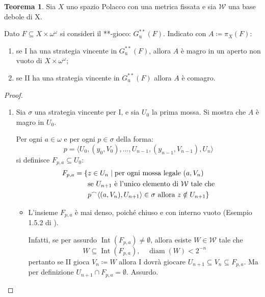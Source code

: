 \documentclass[titlepage]{article}
\newcommand{\1}{\mathds{1}}
\newcommand{\concat}{\null^{\frown}} %
\theoremstyle{definition}%
\newtheorem{thm}{Teorema}[section]
\theoremstyle{plain}
\theoremstyle{remark}
\begin{document}
\begin{thm}\label{sec:org21015ec}
Sia \(X\) uno spazio Polacco con una metrica fissata e sia \(\mathcal{W}\) una base debole di X.

Dato \(F \subseteq X\times \omega^{\omega}\) si consideri il {**-gioco}: \(G^{**}_{\text{u}}(F)\). Indicato con \(A\coloneqq \pi_{X}(F)\):
\begin{enumerate}
\item se I ha una {strategia} {vincente} in \(G^{**}_{\text{u}}(F)\), allora \(A\) è magro in un aperto non vuoto di \(X\times\omega^{\omega}\);
\item se II ha una {strategia} {vincente} in \(G^{**}_{\text{u}}(F)\) allora \(A\) è comagro.
\end{enumerate}
\end{thm}
\begin{proof}\hphantom{a capo}
\begin{enumerate}
\item Sia \(\sigma\) una strategia vincente per I, e sia \(U_{0}\) la prima mossa. Si mostra che \(A\) è {magro} in \(U_{0}\).

Per ogni \(a \in \omega\) e per ogni \(p \in \sigma\) della forma:
\begin{equation*}
 p=\langle
 	U_{0},({y}_{0}, V_{0}), \dots, U_{n-1}, ({y}_{n-1}, V_{n-1}), U_{n}
 \rangle
\end{equation*}
si definisce \(F_{p,a} \subseteq U_{0}\):
\begin{align*}
 F_{p,a} = \{&z \in U_{n}\mid \text{per ogni mossa legale }(a, V_{n})\\
 &\text{se } U_{n+1}\text{ è l'unico elemento di }\mathcal{W}\text{ tale che}\\
 &p \concat \langle(a,V_{n}), U_{n+1}\rangle \in \sigma \text{ allora } z \notin U_{n+1}\}
\end{align*}
\begin{itemize}
\item L'insieme \(F_{p,a}\) è mai denso, poiché chiuso e con interno vuoto (Esempio 1.5.2 di \cite{lmr}).

Infatti, se per assurdo \(\operatorname{Int}(F_{p,a}) \neq \emptyset\), allora esiste \(W \in \mathcal{W}\) tale che
\begin{equation*}
   W \subseteq \operatorname{Int}(F_{p,a}), \quad \operatorname{diam}(W)<2^{-n}
\end{equation*}
pertanto se II gioca \(V_{n} \coloneqq W\) allora I dovrà giocare \(U_{n+1} \subseteq V_{n} \subseteq F_{p,a}\). Ma per definizione \(U_{n+1}\cap F_{p,a} = \emptyset\). Assurdo.


\end{itemize}
\end{enumerate}
\end{proof}
\end{document}
